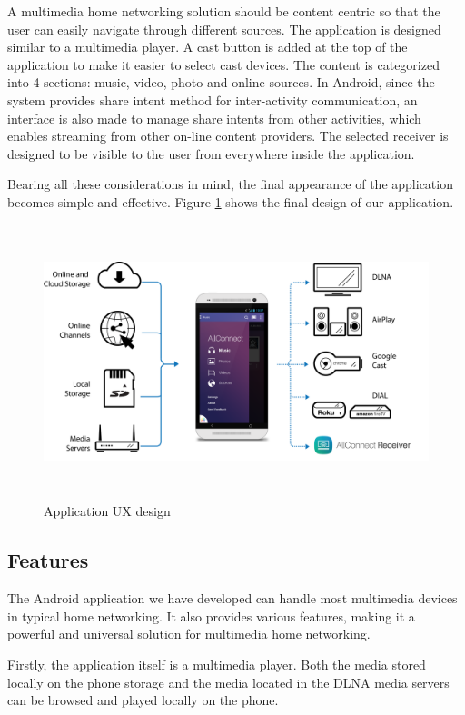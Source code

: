 A multimedia home networking solution should be content centric so that the user
can easily navigate through different sources. The application is designed
similar to a multimedia player. A cast button is added at the top of the
application to make it easier to select cast devices. The content is
categorized into 4 sections: music, video, photo and online sources. In
Android, since the system provides share intent method for inter-activity
communication, an interface is also made to manage share intents from other
activities, which enables streaming from other on-line content providers. The
selected receiver is designed to be visible to the user from everywhere inside
the application.

Bearing all these considerations in mind, the final appearance of the application becomes simple and effective. Figure \ref{chart5} shows the final design of our application.

\begin{figure}[htb]
\centering \includegraphics[height=8cm]{charts/allconnect-app}
\caption{Application UX design \label{chart5}}
\end{figure}

\subsection{Features\label{3_4}}
The Android application we have developed can handle most multimedia devices in typical home networking. It also provides various features, making it a powerful and universal solution for multimedia home networking.

Firstly, the application itself is a multimedia player. Both the media stored locally on the phone storage and the media located in the DLNA media servers can be browsed and played locally on the phone.

